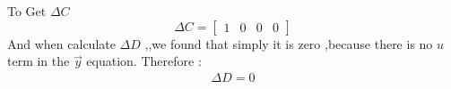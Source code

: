 To Get $\Delta C $
\begin{equation}
	\Delta C =
	\begin{bmatrix}
		1 & 0 & 0 & 0
	\end{bmatrix}
\end{equation}
And when calculate $\Delta D $ ,,we found that simply it is zero ,because there is no $u$ term in the $\vec{y}$ equation.
Therefore :
\begin{equation}
	\begin{split}
		\Delta D = 0
	\end{split}
\end{equation}